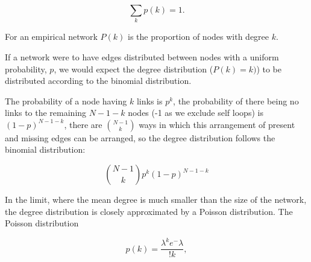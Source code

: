 \begin{equation}
    \sum_k p(k)=1.
\end{equation}

For an empirical network $P(k)$ is the proportion of nodes with degree $k$. 



If a network were to have edges distributed between nodes with a uniform probability, $p$, we would expect the degree distribution ($P(k)=k)$) to be distributed according to the binomial distribution.  

 The probability of a node having $k$ links is $p^k$, the probability of there being no links to the remaining $N-1-k$ nodes (-1 as we exclude self loops) is $(1-p)^{N-1-k}$, there are $\binom{N-1}{k}$ ways in which this arrangement of present and missing edges can be arranged, so the degree distribution follows the binomial distribution\cite{barabasi2016network}:

\begin{equation}
   \binom{N-1}{k}        p^k (1-p)^{N-1-k}
   \label{Equation:BinomialDistributionForDegreeProbability}
\end{equation}

In the limit, where the mean degree is much smaller than the size of the network, the degree distribution is closely approximated by a Poisson distribution\cite{barabasi2016network}. The Poisson distribution

\begin{equation}
    p(k) = \frac{\lambda^k e ^-\lambda}{!k},
\end{equation}

